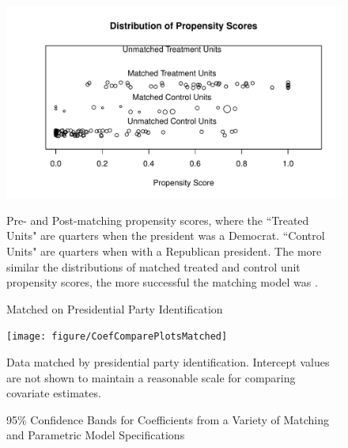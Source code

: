\documentclass[a4paper]{article}\usepackage[]{graphicx}\usepackage[]{color}
\makeatletter
\def\maxwidth{ %
  \ifdim\Gin@nat@width>\linewidth
    \linewidth
  \else
    \Gin@nat@width
  \fi
}
\newenvironment{knitrout}{}{} %
\makeatother
\begin{document}
\begin{figure}[h]
  \caption{Matched on Presidential Party Identification}
  \label{PresPropensityScores}
\begin{knitrout}
\color{fgcolor}

{\centering \includegraphics[width=\maxwidth]{figure/PresPropensity} 

}



\end{knitrout}

  \begin{singlespace}
      {\scriptsize{Pre- and Post-matching propensity scores, where the ``Treated Units" are quarters when the president was a Democrat. ``Control Units" are quarters when with a Republican president. The more similar the distributions of matched treated and control unit propensity scores, the more successful the matching model was \cite[17]{Hollyer2012}.}}
  \end{singlespace}
\end{figure}

\begin{figure}[t]
    \caption{95\% Confidence Bands for Coefficients from a Variety of Matching and Parametric Model Specifications}
    \label{CoefComparePlots2}
    \begin{center}

\begin{knitrout}
\color{fgcolor}

{\centering \texttt{[image: figure/CoefComparePlotsMatched]} 

}



\end{knitrout}

    \end{center}
    \begin{singlespace}
        {\scriptsize{Data matched by presidential party identification. Intercept values are not shown to maintain a reasonable scale for comparing covariate estimates.}}
    \end{singlespace}
\end{figure}
\end{document}
